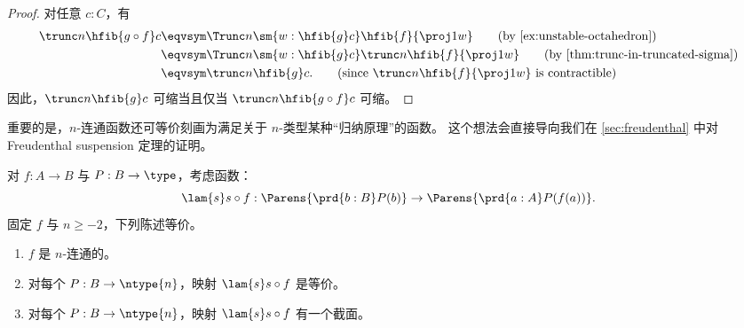 \begin{proof}
对任意 $c:C$，有
\begin{align*}
  \trunc n{\hfib{g\circ f}c}
  & \eqvsym \Trunc n{ \sm{w:\hfib{g}c}\hfib{f}{\proj1 w}}
  \tag{by \cref{ex:unstable-octahedron}}\\
  & \eqvsym \Trunc n{\sm{w:\hfib{g}c} \trunc n{\hfib{f}{\proj1 w}}}
  \tag{by \cref{thm:trunc-in-truncated-sigma}}\\
  & \eqvsym \trunc n{\hfib{g}c}.
  \tag{since $\trunc n{\hfib{f}{\proj1 w}}$ is contractible}
\end{align*}
因此，$\trunc n{\hfib{g}c}$ 可缩当且仅当 $\trunc n{\hfib{g\circ f}c}$ 可缩。
\end{proof}

重要的是，$n$-连通函数还可等价刻画为满足关于 $n$-类型某种“归纳原理”的函数。
这个想法会直接导向我们在 \cref{sec:freudenthal} 中对 Freudenthal suspension 定理的证明。

\begin{lem}\label{prop:nconnected_tested_by_lv_n_dependent types}
对 $f:A\to B$ 与 $P:B\to\type$，考虑函数：
\begin{equation*}
\lam{s} s\circ f :\Parens{\prd{b:B} P(b)}\to\Parens{\prd{a:A}P(f(a))}.
\end{equation*}
固定 $f$ 与 $n\ge -2$，下列陈述等价。
\begin{enumerate}
\item $f$ 是 $n$-连通的。\label{item:conntest1}
\item 对每个 $P:B\to\ntype{n}$，映射 $\lam{s} s\circ f$ 是等价。\label{item:conntest2}
\item 对每个 $P:B\to\ntype{n}$，映射 $\lam{s} s\circ f$ 有一个截面。\label{item:conntest3}
\end{enumerate}
\end{lem}

